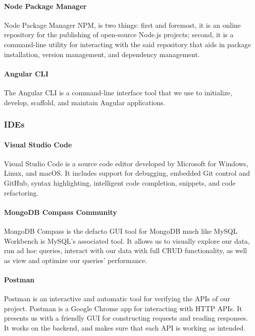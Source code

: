 \paragraph*{Node Package Manager}
Node Package Manager \ac{NPM}, is two things: first and foremost, it is an online repository for the publishing of open-source Node.js projects; second, it is a command-line utility for interacting with the said repository that aids in package installation, version management, and dependency management.
\paragraph*{Angular CLI}
The Angular CLI is a command-line interface tool that we use to initialize, develop, scaffold, and maintain Angular applications. 
\subsubsection{IDEs}

\paragraph*{Visual Studio Code}
Visual Studio Code is a source code editor developed by Microsoft for Windows, Linux, and macOS. It includes support for debugging, embedded Git control and GitHub, syntax highlighting, intelligent code completion, snippets, and code refactoring.


\paragraph*{MongoDB Compass Community}
MongoDB Compass is the defacto GUI tool for MongoDB much like MySQL Workbench is MySQL’s associated tool. It allows us to visually explore our data, run ad hoc queries, interact with our data with full CRUD functionality, as well as view and optimize our queries’ performance.


\paragraph*{Postman}
Postman is an interactive and automatic tool for verifying the APIs of our project. Postman is a Google Chrome app for interacting with HTTP APIs. It presents us with a friendly GUI for constructing requests and reading responses. It works on the backend, and makes sure that each API is working as intended.




